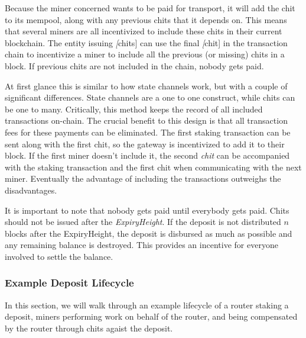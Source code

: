\documentclass[10pt, nonatbib, nocopyrightspace, reprint]{sigplanconf}
\begin{document}
Because the miner concerned wants to be paid for transport, it will add the chit to its mempool, along with any previous chits that it depends on. This means that several miners are all incentivized to include these chits in their current blockchain. The entity issuing \emph[chits] can use the final \emph[chit] in the transaction chain to incentivize a miner to include all the previous (or missing) chits in a block. If previous chits are not included in the chain, nobody gets paid.

At first glance this is similar to how state channels work, but with a couple of significant differences. State channels are a one to one construct, while chits can be one to many. Critically, this method keeps the record of all included transactions on-chain. The crucial benefit to this design is that all transaction fees for these payments can be eliminated. The first staking transaction can be sent along with the first chit, so the gateway is incentivized to add it to their block. If the first miner doesn't include it, the second \emph{chit} can be accompanied with the staking transaction and the first chit when communicating with the next miner. Eventually the advantage of including the transactions outweighs the disadvantages.

It is important to note that nobody gets paid until everybody gets paid. Chits should not be issued after the \emph{ExpiryHeight}. If the deposit is not distributed $n$ blocks after the ExpiryHeight, the deposit is disbursed as much as possible and any remaining balance is destroyed. This provides an incentive for everyone involved to settle the balance.

\subsubsection{Example Deposit Lifecycle}

In this section, we will walk through an example lifecycle of a router staking a deposit, miners performing work on behalf of the router, and being compensated by the router through chits agaist the deposit.
\end{document}
